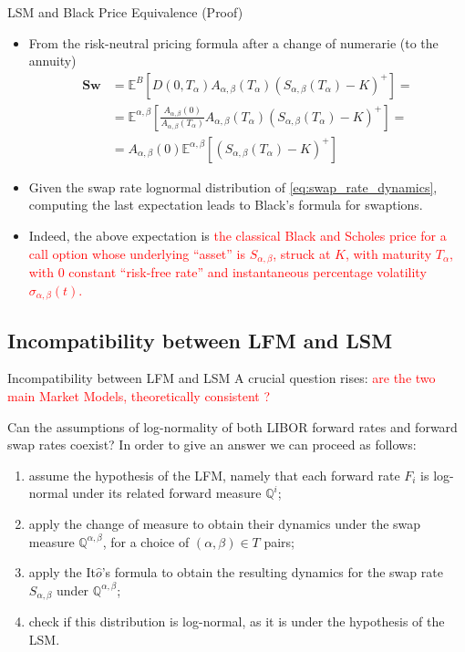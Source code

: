 \documentclass{beamer}
\begin{document}
\begin{frame}{LSM and Black Price Equivalence (Proof)}
	\begin{itemize}
		\item From the risk-neutral pricing formula after a change of numerarie (to the annuity)
		\begin{equation*}
			\begin{aligned}
			\textbf{Sw}&=\mathbb{E}^B\left[D(0,T_\alpha)A_{\alpha,\beta}(T_\alpha)(S_{\alpha,\beta}(T_\alpha)-K)^+\right] = \\
			&=\mathbb{E}^{\alpha,\beta}\left[\frac{A_{\alpha,\beta}(0)}{A_{\alpha,\beta}(T_\alpha)}A_{\alpha,\beta}(T_\alpha)(S_{\alpha,\beta}(T_\alpha)-K)^+\right] = \\		
			&= A_{\alpha,\beta}(0)\mathbb{E}^{\alpha,\beta}\left[(S_{\alpha,\beta}(T_\alpha)-K)^+\right]
		\end{aligned}
		\end{equation*}
		\item Given the swap rate lognormal distribution of \cref{eq:swap_rate_dynamics}, computing the last expectation leads to Black’s formula for swaptions.
		\item Indeed, the above expectation is \textcolor{red}{the classical Black and Scholes price for a call option whose underlying “asset” is $S_{\alpha,\beta}$, struck at $K$, with maturity $T_\alpha$, with 0 constant “risk-free rate” and instantaneous percentage volatility $\sigma_{\alpha,\beta}(t)$.}
	\end{itemize}
\end{frame}

\subsection{Incompatibility between LFM and LSM}
\begin{frame}{Incompatibility between LFM and LSM}
  A crucial question rises: \textcolor{red}{are the two main Market Models, theoretically consistent ?} 
  \pause
  
  Can the assumptions of log-normality of both LIBOR forward rates and forward swap rates coexist? 
  \pause
  In order to give an answer we can proceed as follows:
  \begin{enumerate}
  \item<2-> assume the hypothesis of the LFM, namely that each forward rate $F_i$ is log-normal under its related forward measure $\mathbb{Q}^i$;
  \item<3-> apply the change of measure to obtain their dynamics under the swap measure $\mathbb{Q}^{\alpha,\beta}$, for a choice of $(\alpha,\beta) \in T$ pairs;
  \item<4-> apply the It$\hat{o}$’s formula to obtain the resulting dynamics for the swap rate $S_{\alpha,\beta}$ under $\mathbb{Q}^{\alpha,\beta}$;
  \item<5-> check if this distribution is log-normal, as it is under the hypothesis of the LSM.
  \end{enumerate}
\end{frame}
\end{document}
